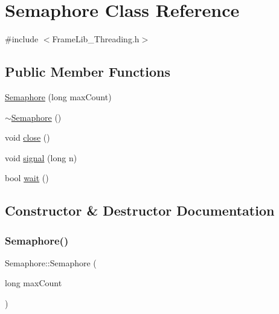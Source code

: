 \hypertarget{class_semaphore}{}\section{Semaphore Class Reference}
\label{class_semaphore}


{\ttfamily \#include $<$Frame\+Lib\+\_\+\+Threading.\+h$>$}

\subsection*{Public Member Functions}
\begin{DoxyCompactItemize}
\item 
\hyperlink{class_semaphore_ab1a0d6b277f585116f7f077b15d09fbf}{Semaphore} (long max\+Count)
\item 
\hyperlink{class_semaphore_a633658a6fde276bffc912028725c6ade}{$\sim$\+Semaphore} ()
\item 
void \hyperlink{class_semaphore_ab04c0934fbf281eb49bd332ecd07c856}{close} ()
\item 
void \hyperlink{class_semaphore_adcd7d652d882d0ab4b068070235ef079}{signal} (long n)
\item 
bool \hyperlink{class_semaphore_a496aae0d0eceef9385c9dcae4c3d9b36}{wait} ()
\end{DoxyCompactItemize}


\subsection{Constructor \& Destructor Documentation}
\mbox{\label{class_semaphore_ab1a0d6b277f585116f7f077b15d09fbf}} 
\subsubsection{\texorpdfstring{Semaphore()}{Semaphore()}}
{\footnotesize\ttfamily Semaphore\+::\+Semaphore (\begin{DoxyParamCaption}\item[{long}]{max\+Count }\end{DoxyParamCaption})}

\mbox{\label{class_semaphore_a633658a6fde276bffc912028725c6ade}} 
